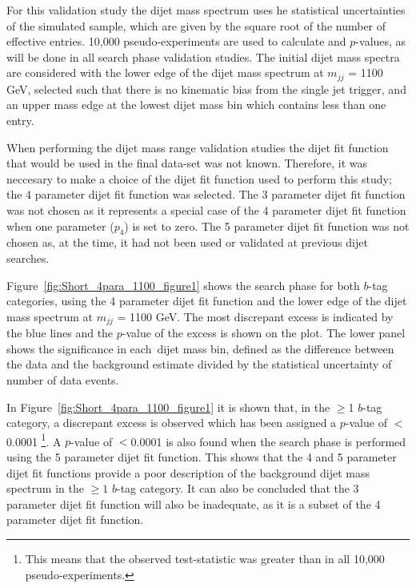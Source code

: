 For this validation study the dijet mass spectrum uses 
he statistical uncertainties of the simulated sample,
which are given by the square root of the number of effective entries.
10,000 pseudo-experiments are used to calculate \bh{} and \dhunt{} $p$-values, as will be done in all \summer{} search phase validation studies.
The initial dijet mass spectra are considered with the lower edge of the dijet mass spectrum at $m_{jj}$ = 1100 GeV,
selected such that there is no kinematic bias from the single jet trigger,
and an upper mass edge at the lowest dijet mass bin which contains less than one entry.

When performing the dijet mass range validation studies
the dijet fit function that would be used in the final data-set was not known.
Therefore, it was neccesary to make a choice of the dijet fit function used to perform this study;
the 4 parameter dijet fit function was selected.
The 3 parameter dijet fit function was not chosen as it represents a special case
of the 4 parameter dijet fit function when one parameter ($p_4$) is set to zero.
The 5 parameter dijet fit function was not chosen as, at the time,
it had not been used or validated at previous dijet searches.

Figure~\ref{fig:Short_4para_1100_figure1} shows the search phase
for both $b$-tag categories, using the 4 parameter dijet fit function and the lower edge of the dijet mass spectrum at $m_{jj}$ = 1100 GeV.
The most discrepant excess is indicated by the blue lines and the \bh{} \mbox{$p$-value} of the excess is shown on the plot.
The lower panel shows the significance in each~dijet mass bin,
defined as the difference between the data and the background estimate divided by the statistical uncertainty of number of data events.


In Figure~\ref{fig:Short_4para_1100_figure1} it is shown that, in the $\geq$1 $b$-tag category,
a discrepant excess is observed which has been assigned a \bh{} \mbox{$p$-value} of $<$0.0001
\footnote{This means that the observed \bh{} test-statistic was greater than in all 10,000 pseudo-experiments.}.
A \bh{} \mbox{$p$-value} of $<$0.0001 is also found when the search phase is performed using the 5 parameter dijet fit function.
This shows that the 4 and 5 parameter dijet fit functions provide a poor description
of the background dijet mass spectrum in the $\geq1$ $b$-tag category.
It can also be concluded that the 3 parameter dijet fit function will also be inadequate, as it is a subset of the 4 parameter dijet fit function.


